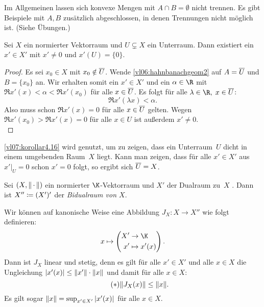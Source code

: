 Im Allgemeinen lassen sich konvexe Mengen mit $A\cap B = \emptyset$ nicht
trennen. Es gibt Beispiele mit $A,B$ zusätzlich abgeschlossen, in denen
Trennungen nicht möglich ist. (Siehe Übungen.)

\begin{thKorollar} \label{vl07:korollar4.16}
    Sei $X$ ein normierter Vektorraum und $U\subsetneq X$ ein Unterraum.
    Dann existiert ein $x'\in X'$ mit $x'\neq 0$ und $x'(U) = \{0\}$.
\end{thKorollar}

\begin{proof}
    Es sei $x_0\in X$ mit $x_0\notin \overline{U}$. 
    Wende \cref{vl06:hahnbanachgeom2} auf $A=\overline{U}$ und $B=\{x_0\}$ an.
    Wir erhalten somit ein $x'\in X'$ und ein $\alpha\in\R$ mit $\Re x'(x) <
    \alpha < \Re x'(x_0)$ für alle $x\in\overline{U}$. Es folgt für alle
    $\lambda\in\R,\;x\in\setclosure U$:
    \[ \Re x'(\lambda x) < \alpha  . \]
    Also muss schon $\Re x'(x) = 0$ für alle $x\in\overline{U}$ gelten. Wegen
    $\Re x'(x_0) > \Re x'(x) = 0$ für alle $x\in U$ ist außerdem $x'\neq 0$.
    \\
\end{proof}

\nnBemerkung
\cref{vl07:korollar4.16} wird genutzt, um zu zeigen, dass ein Unterraum~$U$
dicht in einem umgebenden Raum~$X$ liegt. Kann man zeigen, dass für alle
$x'\in X'$ aus $x'\vert_U = 0$ schon $x'=0$ folgt, so ergibt sich
$\overline{U} = X$.

\begin{thDef} \label{vl07:def:JX}
    Sei $(X,\lVert\,\cdot\,\rVert)$ ein normierter $\K$-Vektorraum und $X'$ der Dualraum zu~$X$
    .
    Dann ist $X'' \coloneqq (X')'$ der \emph{Bidualraum von $X$}.
\end{thDef}
    
Wir können auf kanonische Weise eine Abbildung 
$J_X\colon X\to X''$ wie folgt definieren:
\[ x\mapsto \left( 
        \begin{aligned}
            X' &\to \K  \\
            x' &\mapsto x'(x)
        \end{aligned}
    \right)
. \]
Dann ist $J_X$ linear und stetig, denn es gilt für alle $x'\in X'$ und
alle $x\in X$ die Ungleichung
$\lvert x'(x)\rvert \leq \lVert x'\rVert\cdot \lVert x\rVert$ und damit für alle $x\in X$:
\[ \tag{$\ast$} \label{vl07:ast}
    \lVert J_X(x) \rVert \leq \lVert x\rVert  . \]
Es gilt sogar $\lVert x\rVert = \sup_{x'\in X'} \,\lvert x'(x)\rvert$ für alle $x\in X$.

